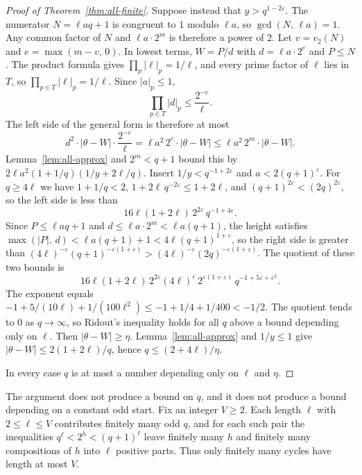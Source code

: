 \documentclass[11pt]{article}
\begin{document}
\begin{proof}[Proof of Theorem~\ref{thm:all-finite}]
Suppose instead that $y > q^{1-2\varepsilon}$.
The numerator $N = \ell aq + 1$ is congruent to $1$ modulo $\ell a$, so $\gcd(N,\, \ell a) = 1$.
Any common factor of $N$ and $\ell a \cdot 2^m$ is therefore a power of $2$.
Let $v = v_2(N)$ and $e = \max(m - v,\, 0)$.
In lowest terms, $W = P/d$ with $d = \ell a \cdot 2^e$ and $P \le N$.
The product formula gives $\prod_p \lvert \ell \rvert_p = 1/\ell$, and every prime factor of $\ell$ lies in $T$, so $\prod_{p \in T} \lvert \ell \rvert_p = 1/\ell$.
Since $\lvert a \rvert_p \le 1$,
\[
\prod_{p \in T} \lvert d \rvert_p \le \frac{2^{-e}}{\ell}.
\]
The left side of the general form is therefore at most
\[
d^2 \cdot \lvert \theta - W \rvert \cdot \frac{2^{-e}}{\ell} = \ell a^2\, 2^e \cdot \lvert \theta - W \rvert \le \ell a^2\, 2^m \cdot \lvert \theta - W \rvert.
\]
Lemma~\ref{lem:all-approx} and $2^m < q+1$ bound this by $2\ell a^2(1 + 1/q)(1/y + 2\ell/q)$.
Insert $1/y < q^{-1+2\varepsilon}$ and $a < 2(q+1)^\varepsilon$.
For $q \ge 4\ell$ we have $1 + 1/q < 2$, $1 + 2\ell\, q^{-2\varepsilon} \le 1 + 2\ell$, and $(q+1)^{2\varepsilon} < (2q)^{2\varepsilon}$, so the left side is less than
\[
16\ell(1+2\ell)\, 2^{2\varepsilon}\, q^{-1+4\varepsilon}.
\]
Since $P \le \ell aq + 1$ and $d \le \ell a \cdot 2^m < \ell a(q+1)$, the height satisfies $\max(\lvert P \rvert,\, d) < \ell a(q+1) + 1 < 4\ell(q+1)^{1+\varepsilon}$, so the right side is greater than $(4\ell)^{-\varepsilon}(q+1)^{-\varepsilon(1+\varepsilon)} > (4\ell)^{-\varepsilon}(2q)^{-\varepsilon(1+\varepsilon)}$.
The quotient of these two bounds is
\[
16\ell(1+2\ell)\, 2^{2\varepsilon}(4\ell)^\varepsilon\, 2^{\varepsilon(1+\varepsilon)}\, q^{-1+5\varepsilon+\varepsilon^2}.
\]
The exponent equals $-1 + 5/(10\ell) + 1/(100\ell^2) \le -1 + 1/4 + 1/400 < -1/2$.
The quotient tends to $0$ as $q \to \infty$, so Ridout's inequality holds for all $q$ above a bound depending only on $\ell$.
Then $\lvert \theta - W \rvert \ge \eta$.
Lemma~\ref{lem:all-approx} and $1/y \le 1$ give $\lvert \theta - W \rvert \le 2(1+2\ell)/q$, hence $q \le (2+4\ell)/\eta$.

In every case $q$ is at most a number depending only on $\ell$ and $\eta$.
\end{proof}

The argument does not produce a bound on $q$, and it does not produce a bound depending on a constant odd start.
Fix an integer $V \ge 2$.
Each length $\ell$ with $2 \le \ell \le V$ contributes finitely many odd $q$, and for each such pair the inequalities $q^\ell < 2^h < (q+1)^\ell$ leave finitely many $h$ and finitely many compositions of $h$ into $\ell$ positive parts.
Thus only finitely many cycles have length at most $V$.
\end{document}
